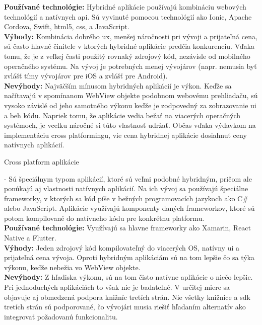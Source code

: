 \begin{itemize}[leftmargin=*]
{\bf Používané technológie:} Hybridné aplikácie používajú kombináciu webových technológií a natívnych \acrshort{api}. Sú vyvinuté pomocou technológií ako Ionic, Apache Cordova, Swift, \acrshort{html}5, \acrshort{css}, a JavaScript. \cite{ma3} \\

{\bf Výhody:} Kombinácia dobrého \acrshort{ux}, menšej náročnosti pri vývoji a prijateľná cena, sú často hlavné činitele v ktorých hybridné aplikácie predčia konkurenciu. Vďaka tomu, že je z veľkej časti použitý rovnaký zdrojový kód, nezávisle od mobilného operačného systému. Na vývoj je potrebných menej vývojárov (napr. nemusia byť zvlášť tímy vývojárov pre iOS a zvlášť pre Android). \cite{ma4} \\
 
{\bf Nevýhody:} Najväčším mínusom hybridných aplikácií je výkon. Keďže sa načítavajú v spomínanom WebView objekte podobnom webovému prehliadaču, sú vysoko závislé od jeho samotného výkonu keďže je zodpovedný za zobrazovanie \acrshort{ui} a beh kódu. Napriek tomu, že aplikácie vedia bežať na viacerých operačných systémoch, je vcelku náročné si túto vlastnosť udržať. Občas vďaka výdavkom na implementáciu cross platformingu, vie cena hybridnej aplikácie dosiahnuť ceny natívnych aplikácií. \cite{ma4} \cite{ma5} \\

{\bf \item Cross platform aplikácie} - Sú špeciálnym typom aplikácií, ktoré sú veľmi podobné hybridným, pričom ale ponúkajú aj vlastnosti natívnych aplikácií. Na ich vývoj sa používajú špeciálne frameworky, v ktorých sa kód píše v bežných programovacích jazykoch ako C\# alebo JavaScript. Aplikácie využívajú komponenty daných frameworkov, ktoré sú potom kompilované do natívneho kódu pre konkrétnu platformu. \\

{\bf Používané technológie:} Využívajú sa hlavne frameworky ako Xamarin, React Native a Flutter. \cite{ma6} \\

{\bf Výhody:} Jeden zdrojový kód kompilovateľný do viacerých OS, natívny \acrshort{ui} a prijateľná cena vývoja. Oproti hybridným aplikáciám sú na tom lepšie čo sa týka výkonu, keďže nebežia vo WebView objekte. \\
 
{\bf Nevýhody:} Z hľadiska výkonu, sú na tom čisto natívne aplikácie o niečo lepšie. Pri jednoduchých aplikáciách to však nie je badateľné. V určitej miere sa objavuje aj obmedzená podpora knižníc tretích strán. Nie všetky knižnice a \acrshort{sdk} tretích strán sú podporované, čo vývojári musia riešiť hľadaním alternatív ako integrovať požadovanú funkcionalitu. \cite{ma6} \\
\end{itemize}


